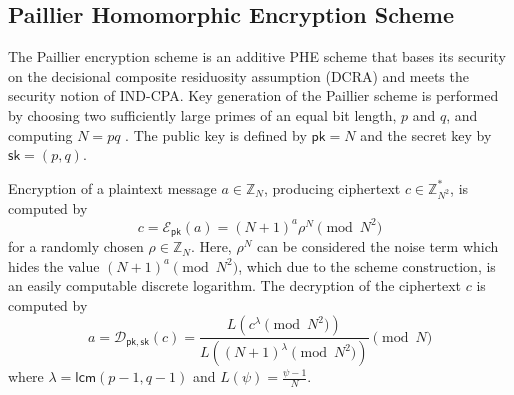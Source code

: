 % 
% 

\subsection{Paillier Homomorphic Encryption Scheme}\label{subsec:prelims:paillier}
The Paillier encryption scheme \cite{paillierPublicKeyCryptosystemsBased1999} is an additive PHE scheme that bases its security on the decisional composite residuosity assumption (DCRA) and meets the security notion of IND-CPA. Key generation of the Paillier scheme is performed by choosing two sufficiently large primes of an equal bit length, $p$ and $q$, and computing $N=pq$ \cite{katzIntroductionModernCryptography2008}. The public key is defined by $\mathsf{pk}=N$ and the secret key by $\mathsf{sk}=(p, q)$.

Encryption of a plaintext message $a \in \mathbb{Z}_N$, producing ciphertext $c \in \mathbb{Z}^{*}_{N^2}$, is computed by
\begin{equation}
    c=\mathcal{E}_{\mathsf{pk}}(a) = (N+1)^a \rho^N \pmod{N^2}
\end{equation}
for a randomly chosen $\rho \in \mathbb{Z}_{N}$. Here, $\rho^N$ can be considered the noise term which hides the value $(N+1)^a \pmod{N^2}$, which due to the scheme construction, is an easily computable discrete logarithm. The decryption of the ciphertext $c$ is computed by
\begin{equation}
    a=\mathcal{D}_{\mathsf{pk},\mathsf{sk}}(c) = \frac{L(c^\lambda\pmod{N^2})}{L((N+1)^\lambda\pmod{N^2})} \pmod{N}
\end{equation}
where $\lambda = \mathsf{lcm}(p-1, q-1)$ and $L(\psi) = \frac{\psi-1}{N}$.


